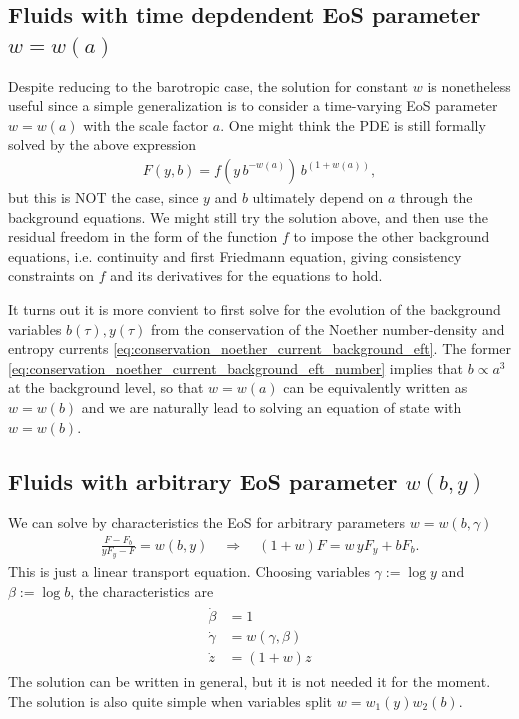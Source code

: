 \subsection{Fluids with time depdendent EoS parameter $w=w(a)$}
%
Despite reducing to the barotropic case, the solution for constant $w$ is nonetheless useful since a simple generalization is to consider a time-varying EoS parameter $w=w(a)$ with the scale factor $a$.
One might think the PDE is still formally solved by the above expression
\begin{align}
    F(y,b)=f(y\,b^{-w(a)})\, b^{(1+w(a))},
\end{align}
but this is NOT the case, since $y$ and $b$ ultimately depend on $a$ through the background equations.
We might still try the solution above, and then use the residual freedom in the form of the function $f$ to impose the other background equations, i.e. continuity and first Friedmann equation, giving consistency constraints on $f$ and its derivatives for the equations to hold.

It turns out it is more convient to first solve for the evolution of the background variables $b(\tau),y(\tau)$ from the conservation of the Noether number-density and entropy currents \eqref{eq:conservation_noether_current_background_eft}.
The former \eqref{eq:conservation_noether_current_background_eft_number} implies that $b\propto a^3$ at the background level, so that $w=w(a)$ can be equivalently written as $w=w(b)$ and we are naturally lead to solving an equation of state with $w=w(b)$.


\subsection{Fluids with arbitrary EoS parameter $w(b,y)$}

We can solve by characteristics the EoS for arbitrary parameters $w=w(b,\gamma)$
\begin{align}
    \frac{F-F_b}{yF_y-F}=w(b,y)\quad\Rightarrow\quad (1+w)F=w\, yF_y+bF_b.
\end{align}
This is just a linear transport equation.
Choosing variables $\gamma:=\log y$ and $\beta:=\log b$, the characteristics are
{\small
\begin{align}\begin{aligned}
    \dot{\beta}&=1\\
    \dot{\gamma}&=w(\gamma,\beta)\\
    \dot{z}&=(1+w)z
\end{aligned}\end{align}}
The solution can be written in general, but it is not needed it for the moment.
The solution is also quite simple when variables split $w=w_1(y)w_2(b)$.  

